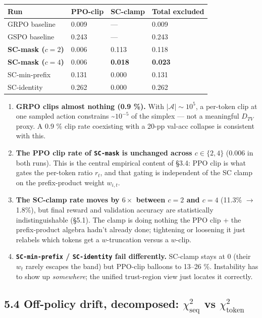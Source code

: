 \documentclass[11pt,a4paper]{article}
\theoremstyle{remark}
\begin{document}
\begin{table}[H]\centering\small
\begin{tabularx}{\textwidth}{LLLL}
\toprule
\textbf{Run} & \textbf{PPO-clip} & \textbf{SC-clamp} & \textbf{Total excluded} \\
\midrule
GRPO baseline & 0.009 & --- & 0.009 \\
GSPO baseline & 0.243 & --- & 0.243 \\
\textbf{SC-mask ($c{=}2$)} & 0.006 & 0.113 & 0.118 \\
\textbf{SC-mask ($c{=}4$)} & 0.006 & \textbf{0.018} & \textbf{0.023} \\
SC-min-prefix & 0.131 & 0.000 & 0.131 \\
SC-identity & 0.262 & 0.000 & 0.262 \\
\bottomrule
\end{tabularx}
\end{table}

\begin{enumerate}[leftmargin=1.2em]
\item \textbf{GRPO clips almost nothing (0.9 \%).} With $|\mathcal A|\sim 10^5$, a per-token clip at one sampled action constrains \textasciitilde{}$10^{-5}$ of the simplex --- not a meaningful $D_{TV}$ proxy. A 0.9 \% clip rate coexisting with a 20-pp val-acc collapse is consistent with this.
\item \textbf{The PPO clip rate of \texttt{SC-mask} is unchanged across $c\in\{2,4\}$} (0.006 in both runs). This is the central empirical content of §3.4: PPO clip is what gates the per-token ratio $r_t$, and that gating is independent of the SC clamp on the prefix-product weight $w_{i,t}$.
\item \textbf{The SC-clamp rate moves by $6\times$ between $c=2$ and $c=4$} (11.3\% $\to$ 1.8\%), but final reward and validation accuracy are statistically indistinguishable (§5.1). The clamp is doing nothing the PPO clip + the prefix-product algebra hadn't already done; tightening or loosening it just relabels which tokens get a $w$-truncation versus a $w$-clip.
\item \textbf{\texttt{SC-min-prefix} / \texttt{SC-identity} fail differently.} SC-clamp stays at 0 (their $w_t$ rarely escapes the band) but PPO-clip balloons to 13--26 \%. Instability has to show up \emph{somewhere}; the unified trust-region view just locates it correctly.
\end{enumerate}

\subsection*{5.4 Off-policy drift, decomposed: $\chi^2_{\mathrm{seq}}$ vs $\chi^2_{\mathrm{token}}$}
\end{document}
